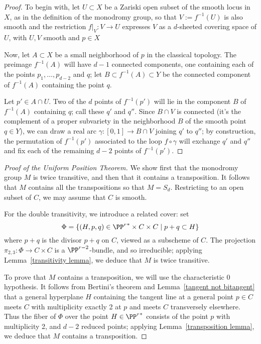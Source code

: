 \begin{proof} To begin with, let $U \subset X$ be a Zariski open subset of the smooth locus in $X$, as in the definition of the monodromy group, so that  $V := f^{-1}(U)$ is also smooth and the restriction $f|_V : V \to U$ expresses $V$ as a $d$-sheeted covering space of $U$, with $U,V$ smooth and $p\in X$

Now, let $A \subset X$ be a small neighborhood of $p$ in the classical topology. The preimage $f^{-1}(A)$ will have $d-1$ connected components, one containing each of the points $p_1,\dots,p_{d-2}$ and $q$; let
 $B \subset f^{-1}(A) \subset Y$ be the connected component of $f^{-1}(A)$ containing the point $q$.

Let $p' \in A \cap U$. Two of the $d$ points of $f^{-1}(p')$ will lie in the component $B$ of $f^{-1}(A)$ containing $q$; call these $q'$ and $q''$. Since $B \cap V$ is connected (it's the complement of a proper subvariety in the neighborhood $B$ of the smooth point $q \in Y$), we can draw a real arc $\gamma : [0,1] \to B \cap V$ joining $q'$ to $q''$; by construction, the permutation of $f^{-1}(p')$ associated to the loop $f \circ \gamma$ will exchange $q'$ and $q''$ and fix each of the remaining $d-2$ points of $f^{-1}(p')$.
\end{proof}


\begin{proof}[Proof of the Uniform Position Theorem]
We show first that the monodromy group $M$ is twice transitive, and then that it contains a transposition. It follows that $M$ contains all the transpositions so that  $M = S_d$.
Restricting to an open subset of $C$, we may assume that $C$ is smooth.

For the double transitivity, we introduce a related cover: set
$$
\Phi = \{ (H, p, q) \in {\PP^r}^* \times C \times C \mid p + q \subset H \}
$$
where $p+q$ is the divisor $p+q$ on $C$, viewed as a subscheme of $C$. The projection $\pi_{2,3} : \Phi \to C \times C$ is a $\PP^{r-2}$-bundle, and so irreducible; applying Lemma~\ref{transitivity lemma}, we deduce that $M$ is twice transitive.

To prove that $M$ contains a transposition, we will use the characteristic 0 hypothesis. It follows from Bertini's theorem and Lemma~\ref{tangent not bitangent} that a general hyperplane $H$ containing
the tangent line at a general point $p\in C$ meets $C$ with multiplicity exactly 2 at $p$ and meets $C$ transversely elsewhere. 
Thus the fiber of $\Phi$ over the point $H \in {\PP^r}^*$ consists of the point $p$ with multiplicity 2, and $d-2$ reduced points; applying Lemma~\ref{transposition lemma}, we deduce that $M$ contains a transposition.
\end{proof}

